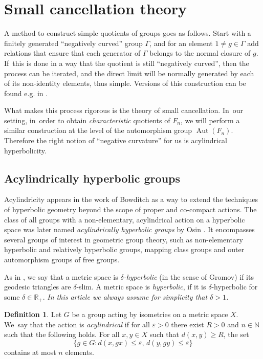\documentclass[JEP,XML,SOM,Unicode]{cedram}
\theoremstyle{definition}
\newtheorem{definition}[theorem]{Definition}
\newcommand{\Aut}{\operatorname{Aut}}
\begin{document}
\section{Small cancellation theory}

A method to construct simple quotients of groups goes as follows. Start with a finitely generated ``negatively curved'' group $\Gamma$, and for an element $1 \neq g \in \Gamma$ add relations that ensure that each generator of $\Gamma$ belongs to the normal closure of $g$. If~this is done in a way that the quotient is still ``negatively curved'', then the process can be iterated, and the direct limit will be normally generated by each of its non-identity elements, thus simple. Versions of this construction can be found e.g. in \cite{Olshanskii:1979b}.

What makes this process rigorous is the theory of small cancellation. In~our setting, in~order to obtain \emph{characteristic} quotients of $F_n$, we will perform a similar construction at the level of the automorphism group $\Aut(F_n)$. Therefore the right notion of ``negative curvature'' for us is acylindrical hyperbolicity.

\subsection{Acylindrically hyperbolic groups}
Acylindricity appears in the work of Bowditch \cite{Bowditch:2008bj} as a way to extend the techniques of hyperbolic geometry beyond the scope of proper and co-compact actions.
The class of all groups with a non-elementary, acylindrical action on a hyperbolic space was later named \emph{acylindrically hyperbolic groups} by Osin \cite{osin}.
It encompasses several groups of interest in geometric group theory, such as non-elementary hyperbolic and relatively hyperbolic groups, mapping class groups and outer automorphism groups of free groups.

As in \cite[III.H, Def.\,1.1]{BH},
we say that a metric space is \emph{$\delta$-hyperbolic} (in the sense of Gromov) if its geodesic triangles are $\delta$-slim.
A metric space is \emph{hyperbolic}, if it is $\delta$-hyperbolic for some $\delta \in\mathbb R_+$.
\emph{In this article we always assume for simplicity that $\delta > 1$.}

\begin{definition}
Let $G$ be a group acting by isometries on a metric space $X$. We~say that the action is \emph{acylindrical} if for all $\varepsilon > 0$ there exist $R > 0$ and $n \in \mathbb{N}$ such that the following holds. For all $x, y \in X$ such that $d(x, y) \geq R$, the set
\[
\{ g \in G : d(x, gx) \leq \varepsilon,\, d(y, gy) \leq \varepsilon \}
\]
contains at most $n$ elements.
\end{definition}
\end{document}
